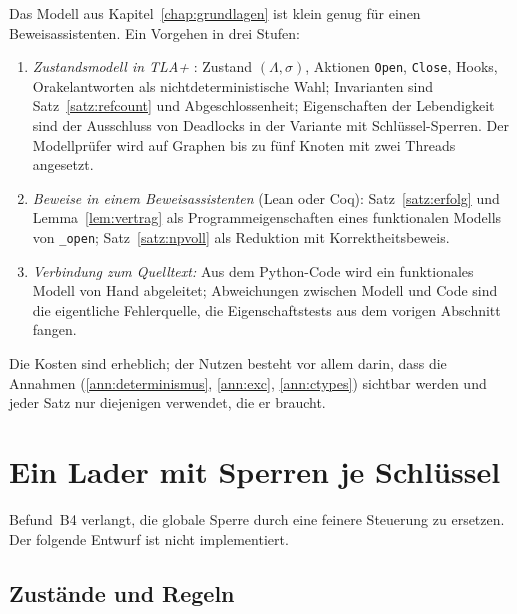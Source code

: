 Das Modell aus Kapitel~\ref{chap:grundlagen} ist klein genug für einen Beweisassistenten. Ein Vorgehen in drei Stufen:
\begin{enumerate}
	\item \emph{Zustandsmodell in TLA+} \cite{lamport2002}: Zustand $(\Lambda,\sigma)$, Aktionen \texttt{Open}, \texttt{Close}, Hooks, Orakelantworten als nichtdeterministische Wahl; Invarianten sind Satz~\ref{satz:refcount} und Abgeschlossenheit; Eigenschaften der Lebendigkeit sind der Ausschluss von Deadlocks in der Variante mit Schlüssel-Sperren. Der Modellprüfer wird auf Graphen bis zu fünf Knoten mit zwei Threads angesetzt.
	\item \emph{Beweise in einem Beweisassistenten} (Lean oder Coq): Satz~\ref{satz:erfolg} und Lemma~\ref{lem:vertrag} als Programmeigenschaften eines funktionalen Modells von \texttt{\_open}; Satz~\ref{satz:npvoll} als Reduktion mit Korrektheitsbeweis.
	\item \emph{Verbindung zum Quelltext:} Aus dem Python-Code wird ein funktionales Modell von Hand abgeleitet; Abweichungen zwischen Modell und Code sind die eigentliche Fehlerquelle, die Eigenschaftstests aus dem vorigen Abschnitt fangen.
\end{enumerate}
Die Kosten sind erheblich; der Nutzen besteht vor allem darin, dass die Annahmen (\ref{ann:determinismus}, \ref{ann:exc}, \ref{ann:ctypes}) sichtbar werden und jeder Satz nur diejenigen verwendet, die er braucht.

\section{Ein Lader mit Sperren je Schlüssel}
\label{sec:schluessel-sperren}

Befund~B4 verlangt, die globale Sperre durch eine feinere Steuerung zu ersetzen. Der folgende Entwurf ist nicht implementiert.

\subsection{Zustände und Regeln}


